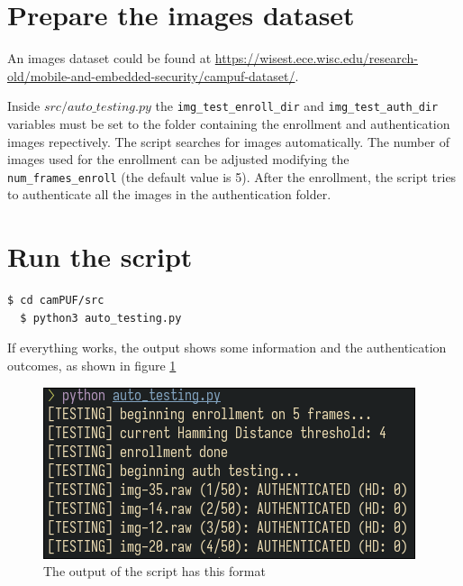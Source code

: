 \section{Prepare the images dataset}\label{sec:preparetheimagedataset}
An images dataset could be found at \url{https://wisest.ece.wisc.edu/research-old/mobile-and-embedded-security/campuf-dataset/}.

Inside $src/auto\_testing.py$ the \texttt{img\_test\_enroll\_dir} and \texttt{img\_test\_auth\_dir} variables must be set to the folder containing the enrollment and authentication images repectively. The script searches for images automatically. The number of images used for the enrollment can be adjusted modifying the \texttt{num\_frames\_enroll} (the default value is 5). After the enrollment, the script tries to authenticate all the images in the authentication folder.

\section{Run the script}\label{sec:runthescript}
\begin{lstlisting}[language=bash]
  $ cd camPUF/src
  $ python3 auto_testing.py
\end{lstlisting}

If everything works, the output shows some information and the authentication outcomes, as shown in figure \ref{fig:resultimg}

\begin{figure}[h!]
	\vspace{0.5cm}
	\includegraphics[width=\textwidth]{images/auto_testing_output.png}
	\caption{The output of the script has this format}
	\label{fig:resultimg}
\end{figure}
